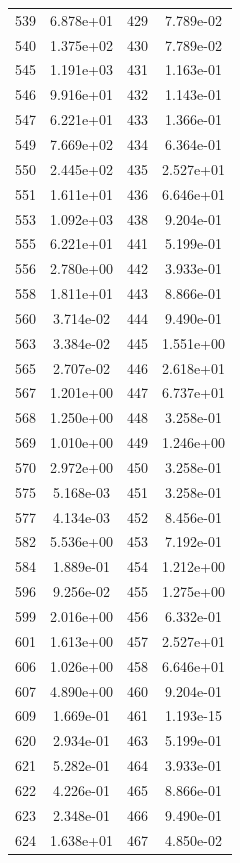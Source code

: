 \documentclass[12pt]{article}
\begin{document}
\begin{longtable}{@{}cccc@{}}
539 & 6.878e+01 & 429 & 7.789e-02 \\
540 & 1.375e+02 & 430 & 7.789e-02 \\
545 & 1.191e+03 & 431 & 1.163e-01 \\
546 & 9.916e+01 & 432 & 1.143e-01 \\
547 & 6.221e+01 & 433 & 1.366e-01 \\
549 & 7.669e+02 & 434 & 6.364e-01 \\
550 & 2.445e+02 & 435 & 2.527e+01 \\
551 & 1.611e+01 & 436 & 6.646e+01 \\
553 & 1.092e+03 & 438 & 9.204e-01 \\
555 & 6.221e+01 & 441 & 5.199e-01 \\
556 & 2.780e+00 & 442 & 3.933e-01 \\
558 & 1.811e+01 & 443 & 8.866e-01 \\
560 & 3.714e-02 & 444 & 9.490e-01 \\
563 & 3.384e-02 & 445 & 1.551e+00 \\
565 & 2.707e-02 & 446 & 2.618e+01 \\
567 & 1.201e+00 & 447 & 6.737e+01 \\
568 & 1.250e+00 & 448 & 3.258e-01 \\
569 & 1.010e+00 & 449 & 1.246e+00 \\
570 & 2.972e+00 & 450 & 3.258e-01 \\
575 & 5.168e-03 & 451 & 3.258e-01 \\
577 & 4.134e-03 & 452 & 8.456e-01 \\
582 & 5.536e+00 & 453 & 7.192e-01 \\
584 & 1.889e-01 & 454 & 1.212e+00 \\
596 & 9.256e-02 & 455 & 1.275e+00 \\
599 & 2.016e+00 & 456 & 6.332e-01 \\
601 & 1.613e+00 & 457 & 2.527e+01 \\
606 & 1.026e+00 & 458 & 6.646e+01 \\
607 & 4.890e+00 & 460 & 9.204e-01 \\
609 & 1.669e-01 & 461 & 1.193e-15 \\
620 & 2.934e-01 & 463 & 5.199e-01 \\
621 & 5.282e-01 & 464 & 3.933e-01 \\
622 & 4.226e-01 & 465 & 8.866e-01 \\
623 & 2.348e-01 & 466 & 9.490e-01 \\
624 & 1.638e+01 & 467 & 4.850e-02 \\

\end{longtable}
\end{document}
